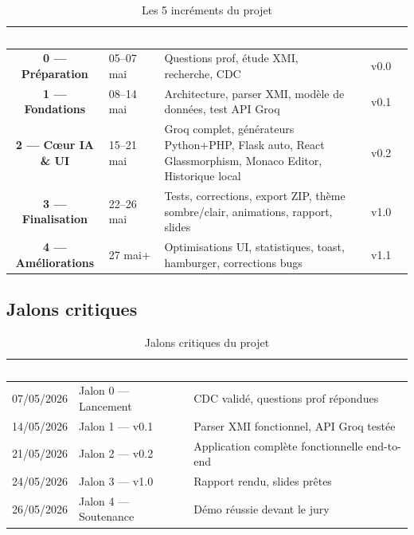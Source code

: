 \documentclass[12pt,a4paper]{article}
\begin{document}
\begin{table}[H]
\centering
\renewcommand{\arraystretch}{1.3}
\begin{tabularx}{\textwidth}{|c|l|X|c|}
\hline
\rowcolor{darkblue!90}
\textcolor{white}{\textbf{Incrément}} &
\textcolor{white}{\textbf{Période}} &
\textcolor{white}{\textbf{Fonctionnalités ajoutées}} &
\textcolor{white}{\textbf{Version}} \\
\hline
\textbf{0 — Préparation} & 05–07 mai & Questions prof, étude XMI, recherche, CDC & v0.0 \\
\hline
\rowcolor{lightgray}
\textbf{1 — Fondations} & 08–14 mai & Architecture, parser XMI, modèle de données, test API Groq & v0.1 \\
\hline
\textbf{2 — Cœur IA \& UI} & 15–21 mai & Groq complet, générateurs Python+PHP, Flask auto, React Glassmorphism, Monaco Editor, Historique local & v0.2 \\
\hline
\rowcolor{lightgray}
\textbf{3 — Finalisation} & 22–26 mai & Tests, corrections, export ZIP, thème sombre/clair, animations, rapport, slides & v1.0 \\
\hline
\textbf{4 — Améliorations} & 27 mai+ & Optimisations UI, statistiques, toast, hamburger, corrections bugs & v1.1 \\
\hline
\end{tabularx}
\caption{Les 5 incréments du projet}
\end{table}

\subsection{Jalons critiques}

\begin{table}[H]
\centering
\renewcommand{\arraystretch}{1.3}
\begin{tabularx}{\textwidth}{|l|l|X|}
\hline
\rowcolor{darkblue!90}
\textcolor{white}{\textbf{Date}} &
\textcolor{white}{\textbf{Jalon}} &
\textcolor{white}{\textbf{Critère de validation}} \\
\hline
07/05/2026 & Jalon 0 — Lancement & CDC validé, questions prof répondues \\
\hline
\rowcolor{lightgray}
14/05/2026 & Jalon 1 — v0.1 & Parser XMI fonctionnel, API Groq testée \\
\hline
21/05/2026 & Jalon 2 — v0.2 & Application complète fonctionnelle end-to-end \\
\hline
\rowcolor{lightgray}
24/05/2026 & Jalon 3 — v1.0 & Rapport rendu, slides prêtes \\
\hline
26/05/2026 & Jalon 4 — Soutenance & Démo réussie devant le jury \\
\hline
\end{tabularx}
\caption{Jalons critiques du projet}
\end{table}
\end{document}
